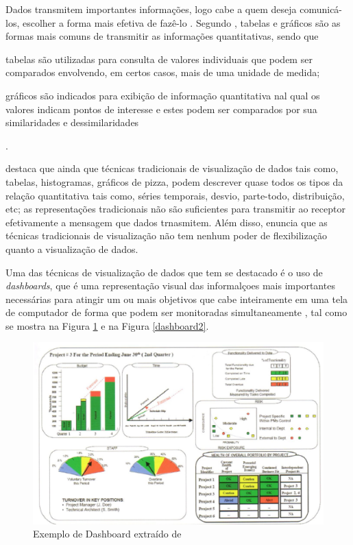 Dados transmitem importantes informações, logo cabe a quem deseja comunicá-los, escolher a forma mais efetiva de fazê-lo \cite{raquel2013}. Segundo , tabelas e gráficos são as formas mais comuns de transmitir as informações quantitativas, sendo que\begin{inparaenum}[i)]
\item tabelas são utilizadas para consulta de valores individuais que podem ser comparados envolvendo, em certos casos, mais de uma unidade de medida;
\item gráficos são indicados para exibição de informação quantitativa nal qual os valores indicam pontos de interesse e estes podem ser comparados por sua similaridades e dessimilaridades\end{inparaenum}. 


 destaca que ainda que técnicas tradicionais de visualização de dados tais como, tabelas, histogramas, gráficos de pizza, podem descrever quase todos os tipos da relação quantitativa tais como, séries temporais, desvio, parte-todo, distribuição, etc; as representações tradicionais não são suficientes para transmitir ao receptor efetivamente a mensagem que dados trnasmitem. Além disso, enuncia que as técnicas tradicionais de visualização não tem nenhum poder de flexibilização quanto a visualização de dados.


Uma das técnicas de visualização de dados que tem se destacado é o uso de \textit{dashboards}, que é uma representação visual das informalçoes mais importantes necessárias para atingir um ou mais objetivos que cabe inteiramente em uma tela de computador de forma que podem ser monitoradas simultaneamente \cite{raquel2013}, tal como se mostra na Figura \ref{dashboard}
e na Figura \ref{dashboard2}.

\begin{figure}[ht!]
\centering
	\includegraphics[keepaspectratio=true,scale=0.8]{figuras/dashboard.eps}
	\caption{Exemplo de Dashboard extraído de 
	}
	\label{dashboard}
\end{figure}
\FloatBarrier


